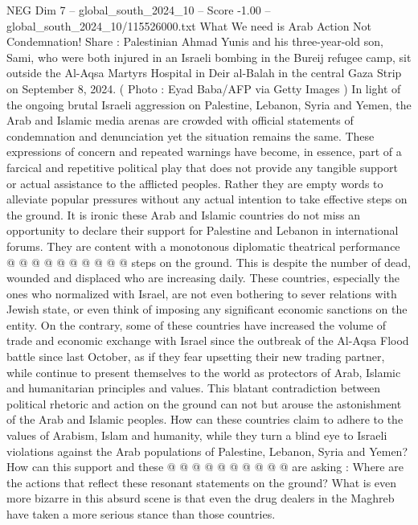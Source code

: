 \begin{textsample}{NEG Dim 7 – global\_south\_2024\_10 – Score -1.00 – global\_south\_2024\_10/115526000.txt}  \label{ex:f7_neg_232}
What We need is Arab Action Not Condemnation!
Share : Palestinian Ahmad Yunis and his three-year-old son, Sami, who were both injured in an Israeli bombing in the Bureij refugee camp, sit outside the Al-Aqsa Martyrs Hospital in Deir al-Balah in the central Gaza Strip on September 8, 2024. ( Photo : Eyad Baba/AFP via Getty Images ) In light of the ongoing brutal Israeli aggression on Palestine, Lebanon, Syria and Yemen, the Arab and Islamic media arenas are crowded with official statements of condemnation and denunciation yet the situation remains the same.
These expressions of concern and repeated warnings have become, in essence, part of a farcical and repetitive political play that does not provide any tangible support or actual assistance to the afflicted peoples.
Rather they are empty words to alleviate popular pressures without any actual intention to take effective steps on the ground.
It is ironic these Arab and Islamic countries do not miss an opportunity to declare their support for Palestine and Lebanon in international forums.
They are content with a monotonous diplomatic theatrical performance @ @ @ @ @ @ @ @ @ @ steps on the ground.
This is despite the number of dead, wounded and displaced who are increasing daily.
These countries, especially the ones who normalized with Israel, are not even bothering to sever relations with Jewish state, or even think of imposing any significant economic sanctions on the entity.
On the contrary, some of these countries have increased the volume of trade and economic exchange with Israel since the outbreak of the Al-Aqsa Flood battle since last October, as if they fear upsetting their new trading partner, while continue to present themselves to the world as protectors of Arab, Islamic and humanitarian principles and values.
This blatant contradiction between political rhetoric and action on the ground can not but arouse the astonishment of the Arab and Islamic peoples.
How can these countries claim to adhere to the values of Arabism, Islam and humanity, while they turn a blind eye to Israeli violations against the Arab populations of Palestine, Lebanon, Syria and Yemen?
How can this support and these @ @ @ @ @ @ @ @ @ @ are asking : Where are the actions that reflect these resonant statements on the ground?
What is even more bizarre in this absurd scene is that even the drug dealers in the Maghreb have taken a more serious stance than those countries.

\end{textsample}
